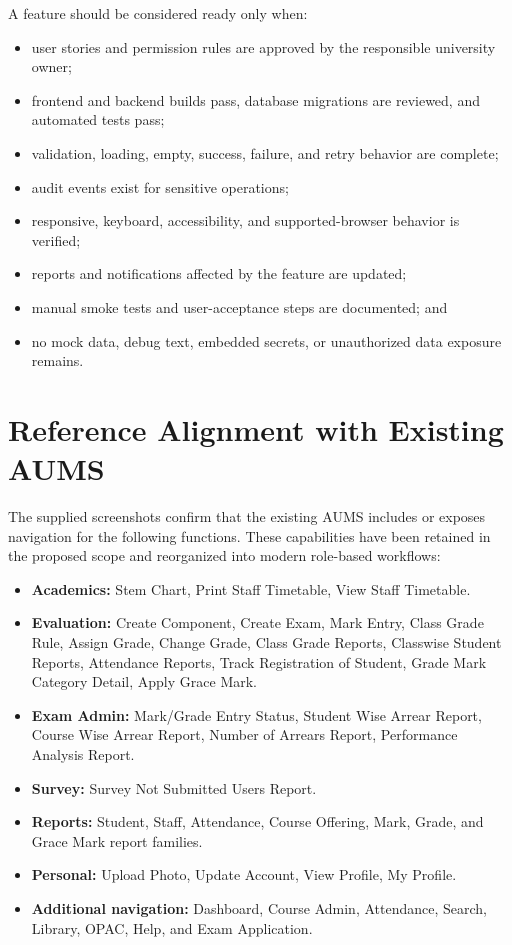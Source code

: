 \documentclass[10pt,a4paper]{article}
\begin{document}
A feature should be considered ready only when:
\begin{itemize}
  \item user stories and permission rules are approved by the responsible university owner;
  \item frontend and backend builds pass, database migrations are reviewed, and automated tests pass;
  \item validation, loading, empty, success, failure, and retry behavior are complete;
  \item audit events exist for sensitive operations;
  \item responsive, keyboard, accessibility, and supported-browser behavior is verified;
  \item reports and notifications affected by the feature are updated;
  \item manual smoke tests and user-acceptance steps are documented; and
  \item no mock data, debug text, embedded secrets, or unauthorized data exposure remains.
\end{itemize}

\section{Reference Alignment with Existing AUMS}

The supplied screenshots confirm that the existing AUMS includes or exposes
navigation for the following functions. These capabilities have been retained
in the proposed scope and reorganized into modern role-based workflows:

\begin{itemize}
  \item \textbf{Academics:} Stem Chart, Print Staff Timetable, View Staff Timetable.
  \item \textbf{Evaluation:} Create Component, Create Exam, Mark Entry, Class Grade Rule,
        Assign Grade, Change Grade, Class Grade Reports, Classwise Student Reports,
        Attendance Reports, Track Registration of Student, Grade Mark Category Detail,
        Apply Grace Mark.
  \item \textbf{Exam Admin:} Mark/Grade Entry Status, Student Wise Arrear Report,
        Course Wise Arrear Report, Number of Arrears Report, Performance Analysis Report.
  \item \textbf{Survey:} Survey Not Submitted Users Report.
  \item \textbf{Reports:} Student, Staff, Attendance, Course Offering, Mark, Grade,
        and Grace Mark report families.
  \item \textbf{Personal:} Upload Photo, Update Account, View Profile, My Profile.
  \item \textbf{Additional navigation:} Dashboard, Course Admin, Attendance, Search,
        Library, OPAC, Help, and Exam Application.
\end{itemize}
\end{document}
